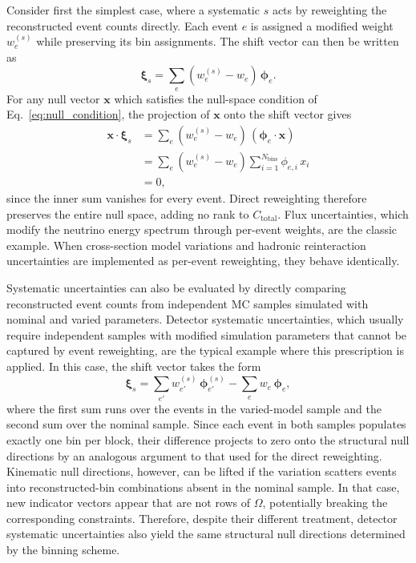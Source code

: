 \documentclass[a4paper,11pt]{article}
\begin{document}
Consider first the simplest case, where a systematic $s$ acts by reweighting the reconstructed event counts directly. Each event $e$ is assigned a modified weight $w_{e}^{(s)}$ while preserving its bin assignments. The shift vector can then be written as
\begin{equation}
    \boldsymbol{\xi}_{s} = \sum_{e} (w_{e}^{(s)} - w_{e}) \, \boldsymbol{\phi}_{e}.
\end{equation}
For any null vector $\mathbf{x}$ which satisfies the null-space condition of Eq.~\eqref{eq:null_condition}, the projection of $\mathbf{x}$ onto the shift vector gives
\begin{equation}
    \begin{split}
        \mathbf{x} \cdot \boldsymbol{\xi}_{s} &= \sum_{e} (w_{e}^{(s)} - w_{e}) \, (\boldsymbol{\phi}_{e} \cdot \mathbf{x})\\
        &= \sum_{e} (w_{e}^{(s)} - w_{e}) \sum_{i=1}^{N_{\text{bins}}} \phi_{e,i}\, x_{i}\\
        &= 0,
    \end{split}
\end{equation}
since the inner sum vanishes for every event. Direct reweighting therefore preserves the entire null space, adding no rank to $C_{\text{total}}$. Flux uncertainties, which modify the neutrino energy spectrum through per-event weights, are the classic example. When cross-section model variations and hadronic reinteraction uncertainties are implemented as per-event reweighting, they behave identically.

Systematic uncertainties can also be evaluated by directly comparing reconstructed event counts from independent MC samples simulated with nominal and varied parameters. Detector systematic uncertainties, which usually require independent samples with modified simulation parameters that cannot be captured by event reweighting, are the typical example where this prescription is applied. In this case, the shift vector takes the form
\begin{equation}
    \boldsymbol{\xi}_{s} = \sum_{e'} w_{e'}^{(s)} \, \boldsymbol{\phi}_{e'}^{(s)} - \sum_{e} w_e \, \boldsymbol{\phi}_{e},
\end{equation}
where the first sum runs over the events in the varied-model sample and the second sum over the nominal sample. Since each event in both samples populates exactly one bin per block, their difference projects to zero onto the structural null directions by an analogous argument to that used for the direct reweighting. Kinematic null directions, however, can be lifted if the variation scatters events into reconstructed-bin combinations absent in the nominal sample. In that case, new indicator vectors appear that are not rows of $\Omega$, potentially breaking the corresponding constraints. Therefore, despite their different treatment, detector systematic uncertainties also yield the same structural null directions determined by the binning scheme.
\end{document}
